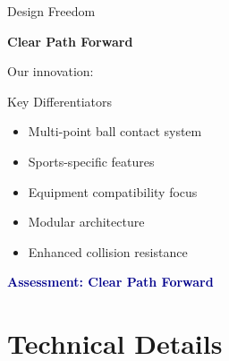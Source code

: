 \documentclass[aspectratio=169]{beamer}
\begin{document}
\begin{frame}{Design Freedom}
\begin{center}
\LARGE \textbf{Clear Path Forward}

\vspace{0.5cm}
\Large
Our innovation:
\end{center}

\begin{block}{Key Differentiators}
\begin{itemize}
    \item Multi-point ball contact system
    \item Sports-specific features
    \item Equipment compatibility focus
    \item Modular architecture
    \item Enhanced collision resistance
\end{itemize}
\end{block}

\vspace{0.5cm}
\begin{center}
\Large \textcolor{darkblue}{\textbf{Assessment: Clear Path Forward}}
\end{center}
\end{frame}

\section{Technical Details}
\end{document}
